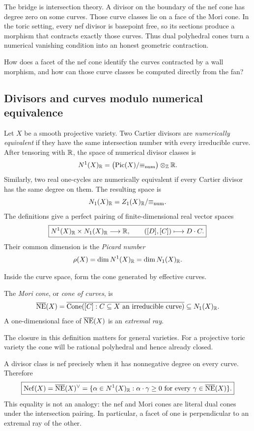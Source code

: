 The bridge is intersection theory.  A divisor on the boundary of the
nef cone has degree zero on some curves.  Those curve classes lie on a
face of the Mori cone.  In the toric setting, every nef divisor is
basepoint free, so its sections produce a morphism that contracts
exactly those curves.  Thus dual polyhedral cones turn a numerical
vanishing condition into an honest geometric contraction.

\begin{guidingquestion}
How does a facet of the nef cone identify the curves contracted by a
wall morphism, and how can those curve classes be computed directly
from the fan?
\end{guidingquestion}

\subsection{Divisors and curves modulo numerical equivalence}

Let \(X\) be a smooth projective variety.  Two Cartier divisors are
\emph{numerically equivalent} if they have the same intersection
number with every irreducible curve.  After tensoring with \(\mathbb{R}\), the
space of numerical divisor classes is
\[
N^1(X)_{\mathbb{R}}
=
\bigl(\operatorname{Pic}(X)/{\equiv_{\mathrm{num}}}\bigr)\otimes_{\mathbb{Z}}\mathbb{R}.
\]
Similarly, two real one-cycles are numerically equivalent if every
Cartier divisor has the same degree on them.  The resulting space is
\[
N_1(X)_{\mathbb{R}}
=
Z_1(X)_{\mathbb{R}}/{\equiv_{\mathrm{num}}}.
\]
The definitions give a perfect pairing of finite-dimensional real
vector spaces
\[
\boxed{
N^1(X)_{\mathbb{R}}\times N_1(X)_{\mathbb{R}}
\longrightarrow\mathbb{R},
\qquad
([D],[C])\longmapsto D\cdot C.}
\]
Their common dimension is the \emph{Picard number}
\[
\rho(X)=\dim N^1(X)_{\mathbb{R}}=\dim N_1(X)_{\mathbb{R}}.
\]

Inside the curve space, form the cone generated by effective curves.

\begin{definition}
The \emph{Mori cone}, or \emph{cone of curves}, is
\[
\overline{\operatorname{NE}}(X)
=
\overline{
\operatorname{Cone}([C]:C\subseteq X\text{ an irreducible curve})}
\subseteq N_1(X)_{\mathbb{R}}.
\]
A one-dimensional face of \(\overline{\operatorname{NE}}(X)\) is an
\emph{extremal ray}.
\end{definition}

The closure in this definition matters for general varieties.  For a
projective toric variety the cone will be rational polyhedral and
hence already closed.

A divisor class is nef precisely when it has nonnegative degree on
every curve.  Therefore
\[
\boxed{
\operatorname{Nef}(X)
=
\overline{\operatorname{NE}}(X)^\vee
=
\{\alpha\in N^1(X)_{\mathbb{R}}:
  \alpha\cdot\gamma\geq0
  \text{ for every }\gamma\in\overline{\operatorname{NE}}(X)\}.}
\]
This equality is not an analogy: the nef and Mori cones are literal
dual cones under the intersection pairing.  In particular, a facet
of one is perpendicular to an extremal ray of the other.

